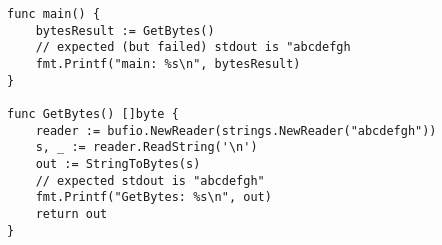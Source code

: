 \begin{lstlisting}[language=Golang, label=lst:escape-analysis-flaw, caption=Escape analysis flaw proof of concept]
func main() {
    bytesResult := GetBytes()
    // expected (but failed) stdout is "abcdefgh
    fmt.Printf("main: %s\n", bytesResult)
}

func GetBytes() []byte {
    reader := bufio.NewReader(strings.NewReader("abcdefgh"))
    s, _ := reader.ReadString('\n')
    out := StringToBytes(s)
    // expected stdout is "abcdefgh"
    fmt.Printf("GetBytes: %s\n", out)
    return out
}
\end{lstlisting}